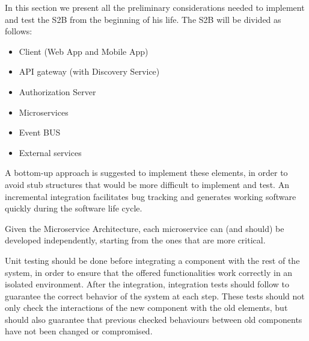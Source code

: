 
In this section we present all the preliminary considerations needed to implement and test the S2B from the beginning of his life.
\newline
\newline
The S2B will be divided as follows:
\begin{itemize}
    \item Client (Web App and Mobile App)
    \item API gateway (with Discovery Service)
    \item Authorization Server
    \item Microservices
    \item Event BUS
    \item External services
\end{itemize}
 
A bottom-up approach is suggested to implement these elements, in order to avoid stub structures that would be more difficult to implement and test. An incremental integration facilitates bug tracking and generates working software quickly during the software life cycle.

Given the Microservice Architecture, each microservice can (and should) be developed independently, starting from the ones that are more critical.
\newline

Unit testing should be done before integrating a component with the rest of the system, in order to ensure that the offered functionalities work correctly in an isolated environment. After the integration, integration tests should follow to guarantee the correct behavior of the system at each step. These tests should not only check the interactions of the new component with the old elements, but should also guarantee that previous checked behaviours between old components have not been changed or compromised.
